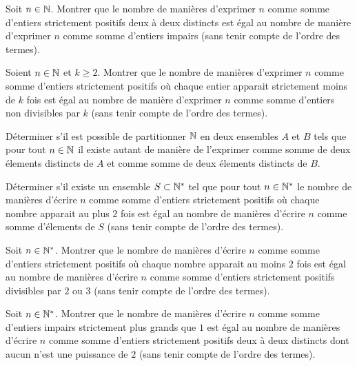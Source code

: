\begin{exo}
Soit $n\in\mathbb N$. Montrer que le nombre de manières d'exprimer $n$ comme somme d'entiers strictement positifs deux à deux distincts est égal au nombre de manière d'exprimer $n$ comme somme d'entiers impairs (sans tenir compte de l'ordre des termes).
\end{exo}


\begin{exo}
Soient $n\in\mathbb N$ et $ k\ge 2$. Montrer que le nombre de manières d'exprimer $n$ comme somme d'entiers strictement positifs où chaque entier apparait strictement moins de $k$ fois est égal au nombre de manière d'exprimer $n$ comme somme d'entiers non divisibles par $k$ (sans tenir compte de l'ordre des termes).
\end{exo}


\begin{exo}
Déterminer s'il est possible de partitionner $\mathbb N$ en deux ensembles $A$ et $B$ tels que pour tout $n\in\mathbb N$ il existe autant de manière de l'exprimer comme somme de deux élements distincts de $A$ et comme somme de deux élements distincts de $B$.
\end{exo}


\begin{exo}
Déterminer s'il existe un ensemble $S\subset\mathbb N^*$ tel que pour tout $n\in\mathbb N^*$ le nombre de manières d'écrire $n$ comme somme d'entiers strictement positifs où chaque nombre apparait au plus $2$ fois est égal au nombre de manières d'écrire $n$ comme somme d'élements de $S$ (sans tenir compte de l'ordre des termes).
\end{exo}


\begin{exo}
Soit $n\in\mathbb N^*$. Montrer que le nombre de manières d'écrire $n$ comme somme d'entiers strictement positifs où chaque nombre apparait au moins $2$ fois est égal au nombre de manières d'écrire $n$ comme somme d'entiers strictement positifs divisibles par $2$ ou $3$ (sans tenir compte de l'ordre des termes).
\end{exo}


\begin{exo}
Soit $n\in\mathbb N^*$. Montrer que le nombre de manières d'écrire $n$ comme somme d'entiers impairs strictement plus grands que $1$ est égal au nombre de manières d'écrire $n$ comme somme d'entiers strictement positifs deux à deux distincts dont aucun n'est une puissance de $2$ (sans tenir compte de l'ordre des termes).
\end{exo}


